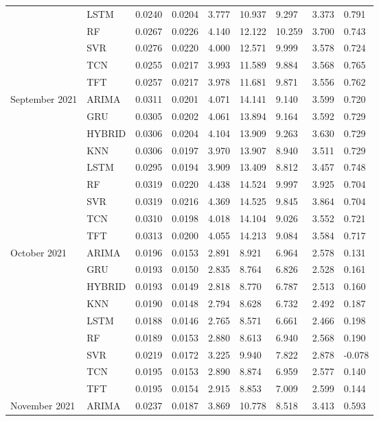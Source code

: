 \begin{tabular}{lllllllll}
 & LSTM & 0.0240 & 0.0204 & 3.777 & 10.937 & 9.297 & 3.373 & 0.791 \\
 & RF & 0.0267 & 0.0226 & 4.140 & 12.122 & 10.259 & 3.700 & 0.743 \\
 & SVR & 0.0276 & 0.0220 & 4.000 & 12.571 & 9.999 & 3.578 & 0.724 \\
 & TCN & 0.0255 & 0.0217 & 3.993 & 11.589 & 9.884 & 3.568 & 0.765 \\
 & TFT & 0.0257 & 0.0217 & 3.978 & 11.681 & 9.871 & 3.556 & 0.762 \\
September 2021 & ARIMA & 0.0311 & 0.0201 & 4.071 & 14.141 & 9.140 & 3.599 & 0.720 \\
 & GRU & 0.0305 & 0.0202 & 4.061 & 13.894 & 9.164 & 3.592 & 0.729 \\
 & HYBRID & 0.0306 & 0.0204 & 4.104 & 13.909 & 9.263 & 3.630 & 0.729 \\
 & KNN & 0.0306 & 0.0197 & 3.970 & 13.907 & 8.940 & 3.511 & 0.729 \\
 & LSTM & 0.0295 & 0.0194 & 3.909 & 13.409 & 8.812 & 3.457 & 0.748 \\
 & RF & 0.0319 & 0.0220 & 4.438 & 14.524 & 9.997 & 3.925 & 0.704 \\
 & SVR & 0.0319 & 0.0216 & 4.369 & 14.525 & 9.845 & 3.864 & 0.704 \\
 & TCN & 0.0310 & 0.0198 & 4.018 & 14.104 & 9.026 & 3.552 & 0.721 \\
 & TFT & 0.0313 & 0.0200 & 4.055 & 14.213 & 9.084 & 3.584 & 0.717 \\
October 2021 & ARIMA & 0.0196 & 0.0153 & 2.891 & 8.921 & 6.964 & 2.578 & 0.131 \\
 & GRU & 0.0193 & 0.0150 & 2.835 & 8.764 & 6.826 & 2.528 & 0.161 \\
 & HYBRID & 0.0193 & 0.0149 & 2.818 & 8.770 & 6.787 & 2.513 & 0.160 \\
 & KNN & 0.0190 & 0.0148 & 2.794 & 8.628 & 6.732 & 2.492 & 0.187 \\
 & LSTM & 0.0188 & 0.0146 & 2.765 & 8.571 & 6.661 & 2.466 & 0.198 \\
 & RF & 0.0189 & 0.0153 & 2.880 & 8.613 & 6.940 & 2.568 & 0.190 \\
 & SVR & 0.0219 & 0.0172 & 3.225 & 9.940 & 7.822 & 2.878 & -0.078 \\
 & TCN & 0.0195 & 0.0153 & 2.890 & 8.874 & 6.959 & 2.577 & 0.140 \\
 & TFT & 0.0195 & 0.0154 & 2.915 & 8.853 & 7.009 & 2.599 & 0.144 \\
November 2021 & ARIMA & 0.0237 & 0.0187 & 3.869 & 10.778 & 8.518 & 3.413 & 0.593 \\

\end{tabular}
